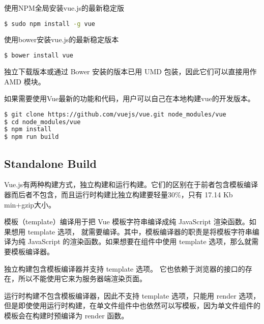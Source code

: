 \begin{compactitem}
\item 使用NPM全局安装vue.js的最新稳定版

\begin{lstlisting}[language=bash]
$ sudo npm install -g vue
\end{lstlisting}

\item 使用bower安装vue.js的最新稳定版本

\begin{lstlisting}[language=bash]
$ bower install vue
\end{lstlisting}
\end{compactitem}

独立下载版本或通过 Bower 安装的版本已用 UMD 包装，因此它们可以直接用作 AMD 模块。



如果需要使用Vue最新的功能和代码，用户可以自己在本地构建vue的开发版本。


\begin{lstlisting}[language=bash]
$ git clone https://github.com/vuejs/vue.git node_modules/vue
$ cd node_modules/vue
$ npm install
$ npm run build
\end{lstlisting}


\subsection{Standalone Build}


Vue.js有两种构建方式，独立构建和运行构建。它们的区别在于前者包含模板编译器而后者不包含，而且运行时构建比独立构建要轻量30\%，只有 17.14 Kb min+gzip大小。


模板（template）编译用于把 Vue 模板字符串编译成纯 JavaScript 渲染函数。如果想用 template 选项， 就需要编译。其中，模板编译器的职责是将模板字符串编译为纯 JavaScript 的渲染函数。如果想要在组件中使用 template 选项，那么就需要模板编译器。


\begin{compactitem}
\item 独立构建包含模板编译器并支持 template 选项。 它也依赖于浏览器的接口的存在，所以不能使用它来为服务器端渲染页面。
\item 运行时构建不包含模板编译器，因此不支持 template 选项，只能用 render 选项，但是即使使用运行时构建，在单文件组件中也依然可以写模板，因为单文件组件的模板会在构建时预编译为 render 函数。
\end{compactitem}






